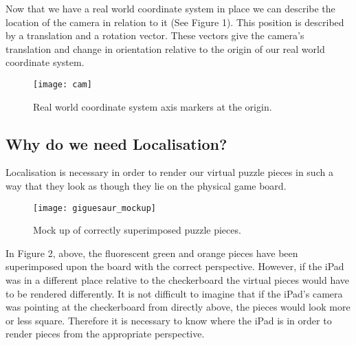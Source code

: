 \documentclass{article}
\begin{document}
Now that we have a real world coordinate system in place we can describe the location of the camera in relation to it (See Figure 1). This position is described by a translation and a rotation vector. These vectors give the camera's translation and change in orientation relative to the origin of our real world coordinate system.\par 


\begin{figure}[ht]
\begin{center}
\texttt{[image: cam]} 
\caption{Real world coordinate system axis markers at the origin.}
\end{center}
\end{figure}

\subsection {Why do we need Localisation?}

Localisation is necessary in order to render our virtual puzzle pieces in such a way that they look as though they lie on the physical game board. 
\vspace*{2\baselineskip}

\begin{figure}[H]
\begin{center}
\texttt{[image: giguesaur\_mockup]} 
\caption{Mock up of correctly superimposed puzzle pieces.}
\end{center}
\end{figure}

In Figure 2, above, the fluorescent green and orange pieces have been superimposed upon the board with the correct perspective. However, if the iPad was in a different place relative to the checkerboard the virtual pieces would have to be rendered differently. It is not difficult to imagine that if the iPad's camera was pointing at the checkerboard from directly above, the pieces would look more or less square. Therefore it is necessary to know where the iPad is in order to render pieces from the appropriate perspective.
\end{document}

